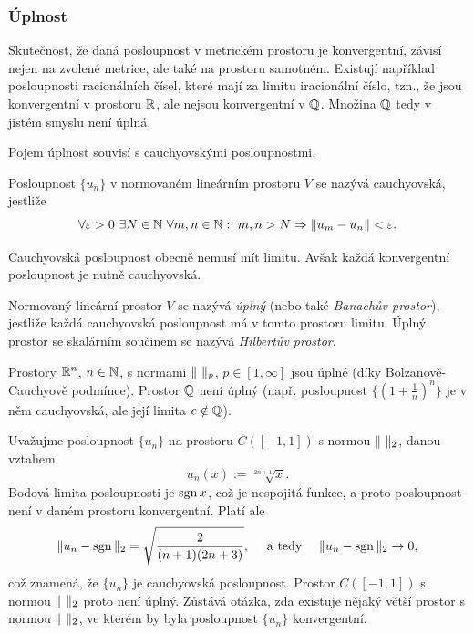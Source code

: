 \subsubsection{Úplnost}
% 
Skutečnost, že daná posloupnost v metrickém prostoru je konvergentní, závisí nejen na zvolené metrice, ale také na prostoru samotném.
Existují například posloupnosti racionálních čísel, které mají za limitu iracionální číslo, tzn., že jsou konvergentní v prostoru $\mathbb R$, ale nejsou konvergentní v $\mathbb Q$.
Množina $\mathbb Q$ tedy v jistém smyslu není úplná.

Pojem úplnost souvisí s cauchyovskými posloupnostmi.
% 
\begin{df}
Posloupnost $\{u_n\}$ v normovaném lineárním prostoru $V$ se nazývá \mbox{cauchyovská}, jestliže
\[ \forall\varepsilon>0~\exists N\in\mathbb N~\forall m,n\in\mathbb N:~m,n>N\Rightarrow \|u_m-u_n\|<\varepsilon. \]
\end{df}
% 
Cauchyovská posloupnost obecně nemusí mít limitu. Avšak každá konvergentní posloupnost je nutně cauchyovská.
% 
\begin{df}
Normovaný lineární prostor $V$ se nazývá \emph{úplný} (nebo také \emph{Banachův prostor}), jestliže každá cauchyovská posloupnost má v tomto prostoru limitu.
Úplný prostor se skalárním součinem se nazývá \emph{Hilbertův prostor}.
\end{df}
% 
\begin{ex}
Prostory $\mathbb R^n$, $n\in\mathbb N$, s normami $\|\ \|_p$, $p\in[1,\infty]$ jsou úplné (díky Bolzanově-Cauchyově podmínce).
Prostor $\mathbb Q$ není úplný (např. posloupnost $\{(1+\frac1n)^n\}$ je v něm cauchyovská, ale její limita $e\notin\mathbb Q$).
\end{ex}

\begin{ex}
Uvažujme posloupnost $\{u_n\}$ na prostoru $C([-1,1])$ s normou $\|\ \|_2$, danou vztahem
\[ u_n(x) := \sqrt[2n+1]{x}. \]
Bodová limita posloupnosti je $\operatorname{sgn} x$, což je nespojitá funkce, a proto posloupnost není v daném prostoru konvergentní.
Platí ale
\[ \|u_n-\operatorname{sgn}\|_2 = \sqrt{\frac2{(n+1)(2n+3)}}, \quad\mbox{ a tedy } \quad \|u_n-\operatorname{sgn}\|_2\rightarrow 0, \]
což znamená, že $\{u_n\}$ je cauchyovská posloupnost.
Prostor $C([-1,1])$ s normou $\|\ \|_2$ proto není úplný.
Zůstává otázka, zda existuje nějaký větší prostor s normou $\|\ \|_2$, ve kterém by byla posloupnost $\{u_n\}$ konvergentní.
\end{ex}

